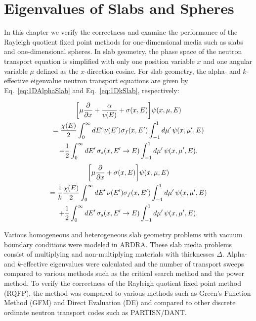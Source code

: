 \chapter{Eigenvalues of Slabs and Spheres}

In this chapter we verify the correctness and examine the performance of the Rayleigh quotient fixed point methods for one-dimensional media such as slabs and one-dimensional spheres. In slab geometry, the phase space of the neutron transport equation is simplified with only one position variable $x$ and one angular variable $\mu$ defined as the $x$-direction cosine. For slab geometry, the alpha- and $k$-effective eigenvalue neutron transport equations are given by Eq.~\ref{eq:1DAlphaSlab} and Eq.~\ref{eq:1DkSlab}, respectively:

\begin{multline}
\bigg [ \mu \frac{\partial}{\partial x} + \frac{\alpha}{v(E)} + \sigma(x,E) \bigg ] \psi(x,\mu,E) \\ = \frac{\chi(E)}{2} \int_{0}^{\infty} \mathop{}\!d E' \, \nu(E') \sigma_{f}(x,E') \int_{-1}^{1} \mathop{}\!d \mu' \, \psi(x,\mu',E) \\ + \frac{1}{2} \int_{0}^{\infty} \mathop{}\!d E' \, \sigma_{s}(x, E' \rightarrow E) \int_{-1}^{1} \mathop{}\!d \mu' \, \psi(x,\mu',E),
\label{eq:1DAlphaSlab}
\end{multline}
\begin{multline}
\bigg [ \mu \frac{\partial}{\partial x}  + \sigma(x,E) \bigg ] \psi(x,\mu,E) \\ = \frac{1}{k} \frac{\chi(E)}{2} \int_{0}^{\infty} \mathop{}\!d E' \, \nu(E') \sigma_{f}(x,E') \int_{-1}^{1} \mathop{}\!d \mu' \,\psi(x,\mu',E) \\ + \frac{1}{2} \int_{0}^{\infty} \mathop{}\!d E' \, \sigma_{s}(x, E' \rightarrow E) \int_{-1}^{1} \mathop{}\!d \mu' \, \psi(x,\mu',E).
\label{eq:1DkSlab}
\end{multline}

Various homogeneous and heterogeneous slab geometry problems with vacuum boundary conditions were modeled in ARDRA. These slab media problems consist of multiplying and non-multiplying materials with thicknesses $\Delta$. Alpha- and $k$-effective eigenvalues were calculated and the number of transport sweeps compared to various methods such as the critical search method and the power method. To verify the correctness of the Rayleigh quotient fixed point method (RQFP), the method was compared to various methods such as Green's Function Method (GFM) and Direct Evaluation (DE) and compared to other discrete ordinate neutron transport codes such as PARTISN/DANT.

